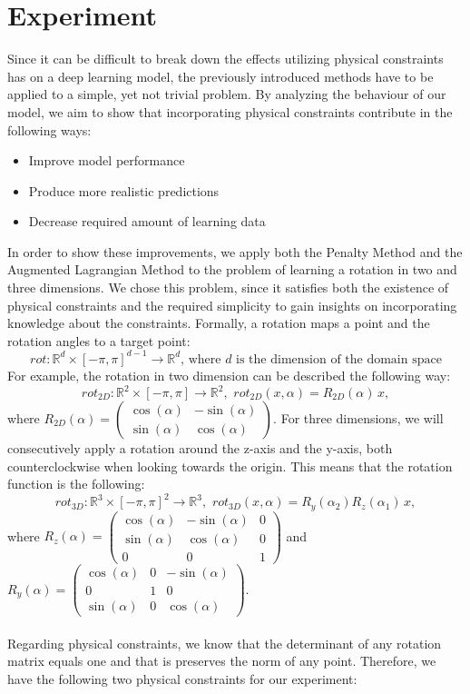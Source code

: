 \label{section:experiment}
\section{Experiment}

Since it can be difficult to break down the effects utilizing physical constraints has on a deep learning model, the previously introduced methods have to be applied to a simple, yet not trivial problem. By analyzing the behaviour of our model, we aim to show that incorporating physical constraints contribute in the following ways:
\begin{itemize}
	\item Improve model performance
	\item Produce more realistic predictions
	\item Decrease required amount of learning data
\end{itemize}

In order to show these improvements, we apply both the Penalty Method and the Augmented Lagrangian Method to the problem of learning a rotation in two and three dimensions. We chose this problem, since it satisfies both the existence of physical constraints and the required simplicity to gain insights on incorporating knowledge about the constraints. Formally, a rotation maps a point and the rotation angles to a target point:
\[rot: \mathbb{R}^{d} \times [- \pi, \pi] ^{d-1} \to \mathbb{R}^{d} \text{, where $d$ is the dimension of the domain space} \]
For example, the rotation in two dimension can be described the following way:
\[rot_{2D}: \mathbb{R}^{2} \times [- \pi, \pi]  \to \mathbb{R}^{2},\,\, rot_{2D}(x, \alpha) = R_{2D}(\alpha) \,x, \]
where $R_{2D}(\alpha) = \begin{pmatrix} \cos(\alpha) & -\sin(\alpha) \\\sin(\alpha) & \cos(\alpha) \end{pmatrix}$.
For three dimensions, we will consecutively apply a rotation around the z-axis and the y-axis, both counterclockwise when looking towards the origin. This means that the rotation function is the following:
\[rot_{3D}: \mathbb{R}^{3} \times [- \pi, \pi]^2 \to \mathbb{R}^{3},\,\, rot_{3D}(x, \alpha) = R_{y}(\alpha_2) R_{z}(\alpha_1) \,x, \]
where $R_{z}(\alpha) = \begin{pmatrix} \cos(\alpha) & -\sin(\alpha) & 0\\\sin(\alpha) & \cos(\alpha) & 0\\ 0 & 0 & 1\end{pmatrix}$
and $R_{y}(\alpha) = \begin{pmatrix} \cos(\alpha) & 0 & -\sin(\alpha)\\ 0 & 1 & 0\\\sin(\alpha) & 0 & \cos(\alpha)\end{pmatrix}$.\\
\\
\indent Regarding physical constraints, we know that the determinant of any rotation matrix equals one and that is preserves the norm of any point. Therefore, we have the following two physical constraints for our experiment:\\

